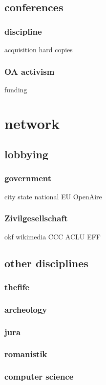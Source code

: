 \documentclass[guidelines,nonflat,modfonts] {langsci/langscibook}
\begin{document}
\subsection{conferences}
\subsubsection{discipline}
                    acquisition
                    hard copies
\subsubsection{OA activism}
                    funding
\section{network}
\subsection{lobbying}
\subsubsection{government}
                    city 
                    state
                    national
                    EU
                        OpenAire
\subsubsection{Zivilgesellschaft}
                    okf
                    wikimedia
                    CCC
                    ACLU
                    EFF
\subsection{other disciplines}
\subsubsection{thefife}
\subsubsection{archeology}
\subsubsection{jura}
\subsubsection{romanistik}
\subsubsection{computer science}
\end{document}
